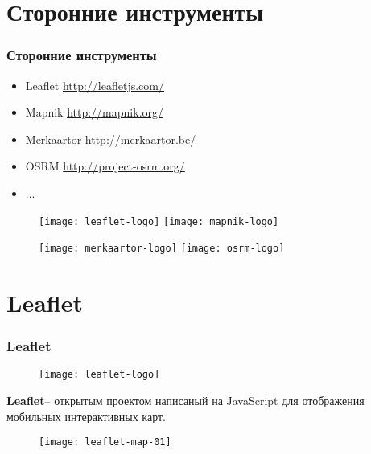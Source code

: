 \section{Сторонние инструменты}
\begin{frame}
    \frametitle{Сторонние инструменты}
    \begin{itemize}
        \item Leaflet \url{http://leafletjs.com/}
        \item Mapnik \url{http://mapnik.org/}
        \item Merkaartor \url{http://merkaartor.be/}
        \item OSRM \url{http://project-osrm.org/}
        \item ...\footnotemark
    \end{itemize}
    \begin{figure}[ht!]
        \texttt{[image: leaflet-logo]}\quad
        \texttt{[image: mapnik-logo]}
    \end{figure}
    \begin{figure}[ht!]
        \texttt{[image: merkaartor-logo]}\quad
        \texttt{[image: osrm-logo]}
    \end{figure}
\end{frame}

\section{Leaflet}
\begin{frame}
    \frametitle{Leaflet}
    \begin{figure}[ht!]
        \texttt{[image: leaflet-logo]}
    \end{figure}
    \textbf{Leaflet}\footnotemark -- открытым проектом написаный на 
    JavaScript для отображения мобильных интерактивных карт.
    \begin{figure}[ht!]
        \texttt{[image: leaflet-map-01]}
        \footnotemark
    \end{figure}
\end{frame}

